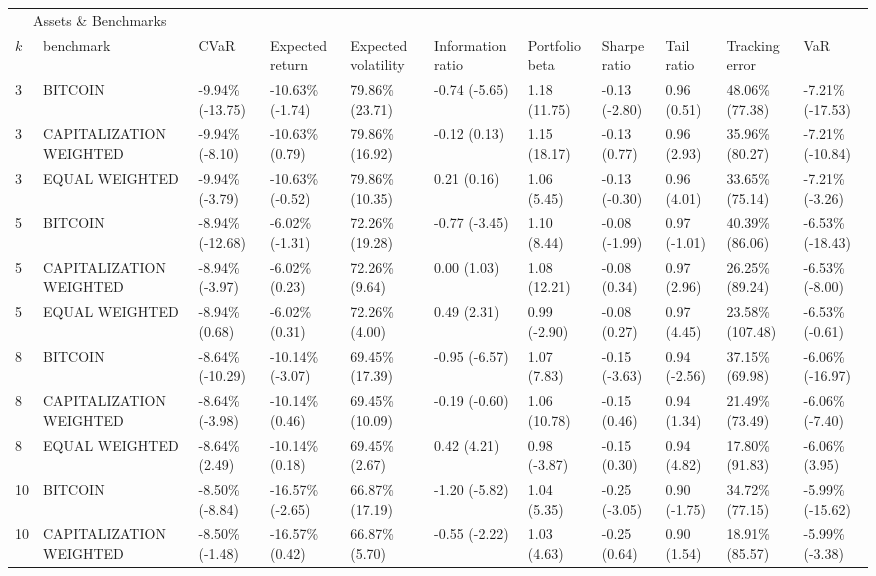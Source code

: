 \documentclass{article}
\begin{document}
\begin{landscape}
\begin{table}[H]
  \centering
  \begin{tabular}{p{0.4cm}|p{3cm}|p{1.65cm}|p{1.65cm}|p{1.65cm}|p{1.65cm}|p{1.65cm}|p{1.65cm}|p{1.65cm}|p{1.65cm}|p{1.65cm}}%
    \toprule
    \multicolumn{2}{c}{Assets \& Benchmarks}                   \\
    \cmidrule(r){1-2}
    $k$ & benchmark & CVaR & Expected return & Expected volatility&Information ratio&Portfolio beta&Sharpe ratio&Tail ratio&Tracking error&VaR\\
    \midrule 
3&BITCOIN&-9.94\% (-13.75)&-10.63\% (-1.74)&79.86\% (23.71)&-0.74 (-5.65)&1.18 (11.75)&-0.13 (-2.80)&0.96 (0.51)&48.06\% (77.38)&-7.21\% (-17.53)
\\ 
3&CAPITALIZATION WEIGHTED&-9.94\% (-8.10)&-10.63\% (0.79)&79.86\% (16.92)&-0.12 (0.13)&1.15 (18.17)&-0.13 (0.77)&0.96 (2.93)&35.96\% (80.27)&-7.21\% (-10.84)
\\ 
3&EQUAL WEIGHTED&-9.94\% (-3.79)&-10.63\% (-0.52)&79.86\% (10.35)&0.21 (0.16)&1.06 (5.45)&-0.13 (-0.30)&0.96 (4.01)&33.65\% (75.14)&-7.21\% (-3.26)
\\ 
5&BITCOIN&-8.94\% (-12.68)&-6.02\% (-1.31)&72.26\% (19.28)&-0.77 (-3.45)&1.10 (8.44)&-0.08 (-1.99)&0.97 (-1.01)&40.39\% (86.06)&-6.53\% (-18.43)
\\ 
5&CAPITALIZATION WEIGHTED&-8.94\% (-3.97)&-6.02\% (0.23)&72.26\% (9.64)&0.00 (1.03)&1.08 (12.21)&-0.08 (0.34)&0.97 (2.96)&26.25\% (89.24)&-6.53\% (-8.00)
\\ 
5&EQUAL WEIGHTED&-8.94\% (0.68)&-6.02\% (0.31)&72.26\% (4.00)&0.49 (2.31)&0.99 (-2.90)&-0.08 (0.27)&0.97 (4.45)&23.58\% (107.48)&-6.53\% (-0.61)
\\ 
8&BITCOIN&-8.64\% (-10.29)&-10.14\% (-3.07)&69.45\% (17.39)&-0.95 (-6.57)&1.07 (7.83)&-0.15 (-3.63)&0.94 (-2.56)&37.15\% (69.98)&-6.06\% (-16.97)
\\ 
8&CAPITALIZATION WEIGHTED&-8.64\% (-3.98)&-10.14\% (0.46)&69.45\% (10.09)&-0.19 (-0.60)&1.06 (10.78)&-0.15 (0.46)&0.94 (1.34)&21.49\% (73.49)&-6.06\% (-7.40)
\\ 
8&EQUAL WEIGHTED&-8.64\% (2.49)&-10.14\% (0.18)&69.45\% (2.67)&0.42 (4.21)&0.98 (-3.87)&-0.15 (0.30)&0.94 (4.82)&17.80\% (91.83)&-6.06\% (3.95)
\\ 
10&BITCOIN&-8.50\% (-8.84)&-16.57\% (-2.65)&66.87\% (17.19)&-1.20 (-5.82)&1.04 (5.35)&-0.25 (-3.05)&0.90 (-1.75)&34.72\% (77.15)&-5.99\% (-15.62)
\\ 
10&CAPITALIZATION WEIGHTED&-8.50\% (-1.48)&-16.57\% (0.42)&66.87\% (5.70)&-0.55 (-2.22)&1.03 (4.63)&-0.25 (0.64)&0.90 (1.54)&18.91\% (85.57)&-5.99\% (-3.38)

\end{tabular}
\end{table}
\end{landscape}
\end{document}
